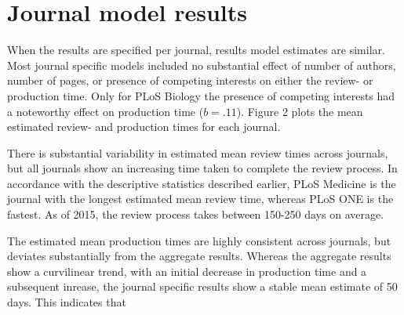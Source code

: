 \section*{Journal model results}
When the results are specified per journal, results model estimates are similar. Most journal specific models included no substantial effect of number of authors, number of pages, or presence of competing interests on either the review- or production time. Only for PLoS Biology the presence of competing interests had a noteworthy effect on production time ($b=.11$). Figure 2 plots the mean estimated review- and production times for each journal.

There is substantial variability in estimated mean review times across journals, but all journals show an increasing time taken to complete the review process. In accordance with the descriptive statistics described earlier, PLoS Medicine is the journal with the longest estimated mean review time, whereas PLoS ONE is the fastest. As of 2015, the review process takes between 150-250 days on average.

The estimated mean production times are highly consistent across journals, but deviates substantially from the aggregate results. Whereas the aggregate results show a curvilinear trend, with an initial decrease in production time and a subsequent inrease, the journal specific results show a stable mean estimate of 50 days. This indicates that 